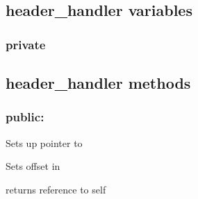 \documentclass[letterpaper,10pt,english]{sphinxmanual}
\begin{document}
\subsection{header\_handler variables}
\label{header_handler:header-handler-variables}

\subsubsection{private}
\label{header_handler:private}

\subsection{header\_handler methods}
\label{header_handler:header-handler-methods}\begin{quote}

\begin{fulllineitems}
\label{header_handler:header_handler::file__std::ifstreamP}
\end{fulllineitems}

\end{quote}


\subsubsection{public:}
\label{header_handler:public}

\begin{fulllineitems}
\label{header_handler:header_handler__std::ifstreamP}
Sets up {\hyperref[header_handler:header_handler::file__std::ifstreamP]{}} pointer to
{\hyperref[mobireader:mobireader::file__ifstreamP]{}}

\end{fulllineitems}


\begin{fulllineitems}
\label{header_handler:header_handler::offset__unsigned-i}
Sets offset in {\hyperref[header_handler:header_handler::file__std::ifstreamP]{}}

returns reference to self

\end{fulllineitems}
\end{document}
